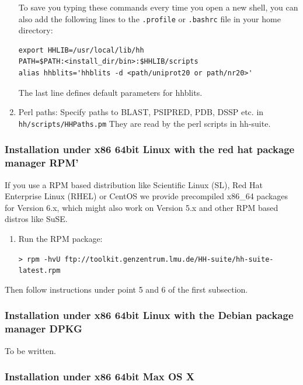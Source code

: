\documentclass[11pt,a4paper]{article}
\begin{document}
\begin{enumerate}
To save you typing these commands every time you open a new shell, you can also add the following lines to the \verb`.profile` or \verb`.bashrc` file in your home directory:
\begin{verbatim}
export HHLIB=/usr/local/lib/hh
PATH=$PATH:<install_dir/bin>:$HHLIB/scripts
alias hhblits='hhblits -d <path/uniprot20 or path/nr20>'
\end{verbatim}
The last line defines default parameters for hhblits. 

\item Perl paths: Specify paths to BLAST, PSIPRED, PDB, DSSP etc. in 
\verb`hh/scripts/HHPaths.pm`
They are read by the perl scripts in hh-suite.

\end{enumerate}

\subsubsection*{Installation under x86 64bit Linux with the red hat package manager RPM'}

If you use a RPM based distribution like Scientific Linux (SL), Red Hat Enterprise Linux (RHEL) or CentOS we provide precompiled x86\_64 packages for
Version 6.x, which might also work on Version 5.x and other RPM based distros
like SuSE.

\begin{enumerate}
\item Run the RPM package:

  \verb`> rpm -hvU ftp://toolkit.genzentrum.lmu.de/HH-suite/hh-suite-latest.rpm`
\end{enumerate}

Then follow instructions under point 5 and 6 of the first subsection.

\subsubsection*{Installation under x86 64bit Linux with the Debian package manager DPKG}

To be written.


\subsubsection*{Installation under x86 64bit Max OS X}
\end{document}
